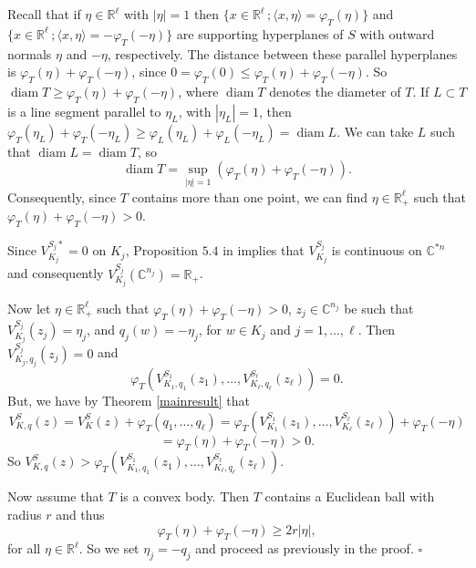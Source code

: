 \documentclass[a4paper,12pt,leqno,english]{article}
\numberwithin{equation}{section}
\newenvironment{proof}{\medbreak\noindent{\bf  Proof:}\rm}{\hfill$\square$\rm}
\begin{document}
\begin{proof}
Recall that if $\eta \in \mathbb{R}^\ell$ with $|\eta| = 1$ then
    $\{x \in \mathbb{R}^\ell\,; \langle x, \eta \rangle = \varphi_T(\eta)\}$
    and
    $\{x \in \mathbb{R}^\ell\,; \langle x, \eta \rangle = -\varphi_T(-\eta)\}$
    are supporting hyperplanes of $S$ with outward normals $\eta$ and $-\eta$, respectively.
The distance between these parallel hyperplanes is $\varphi_T(\eta) + \varphi_T(-\eta)$,
    since $0 = \varphi_T(0) \leq \varphi_T(\eta) + \varphi_T(-\eta)$.
So $\operatorname{diam} T \geq \varphi_T(\eta) + \varphi_T(-\eta)$,
    where $\operatorname{diam}T$ denotes the diameter of $T$.
If $L \subset T$ is a line segment parallel to $\eta_L$, with $|\eta_L| = 1$,
    then $\varphi_T(\eta_L) + \varphi_T(-\eta_L) \geq \varphi_L(\eta_L) + \varphi_L(-\eta_L) = \operatorname{diam} L$.
We can take $L$ such that $\operatorname{diam} L = \operatorname{diam} T$, so
\begin{equation*}
    \operatorname{diam} T
    = 
    \sup_{|\eta| = 1} (\varphi_T(\eta) + \varphi_T(-\eta)).
\end{equation*}
Consequently, since $T$ contains more than one point, we can find $\eta \in \mathbb{R}^\ell_+$ such that $\varphi_T(\eta) + \varphi_T(-\eta) > 0$.

Since $V^{S_j*}_{K_j} = 0$ on $K_j$,
    Proposition $5.4$ in \cite{MagSigSigSno:2023} implies that $V^{S_j}_{K_j}$ is continuous on $\mathbb{C}^{*n}$ and
    consequently $V^{S_j}_{K_j}(\mathbb{C}^{n_j}) = \mathbb{R}_+$.

Now let 
    $\eta \in \mathbb{R}_+^\ell$ such that $\varphi_T(\eta) + \varphi_T(-\eta) > 0$,
    $z_j \in \mathbb{C}^{n_j}$ be such that $V^{S_j}_{K_j}(z_j) = \eta_j$, and
    $q_j(w) = -\eta_j$, for $w \in K_j$ and $j = 1, \dots, \ell$.
Then $V^{S_j}_{K_j, q_j}(z_j) = 0$ and
\begin{equation*}
    \varphi_T(V^{S_1}_{K_1, q_1}(z_1),
        \dots,
        V^{S_\ell}_{K_\ell, q_\ell}(z_\ell))
    =
    0.
\end{equation*}
But, we have by Theorem \ref{mainresult} that
\begin{equation*}
    V^S_{K, q}(z)
    =
    V^S_K(z)
    +
    \varphi_T(q_1, \dots, q_\ell)
    =
    \varphi_T(V^{S_1}_{K_1}(z_1), \dots, V^{S_\ell}_{K_\ell}(z_\ell))
    +
    \varphi_T(-\eta)
\end{equation*}
\begin{equation*}
    =
    \varphi_T(\eta)
    +
    \varphi_T(-\eta)
    >
    0.
\end{equation*}
So $V^S_{K, q}(z) > \varphi_T(V^{S_1}_{K_1, q_1}(z_1), \dots, V^{S_\ell}_{K_\ell, q_\ell}(z_\ell))$.

Now assume that $T$ is a convex body.
Then $T$ contains a Euclidean ball with radius $r$ and thus
\begin{equation*}
    \varphi_T(\eta) + \varphi_T(-\eta)
    \geq
    2r|\eta|,
\end{equation*}
for all $\eta \in \mathbb{R}^{\ell}$.
So we set $\eta_j = -q_j$ and proceed as previously in the proof.
\end{proof}
\end{document}
